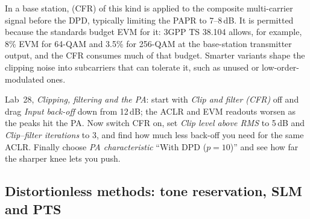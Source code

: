 
In a base station,  (CFR) of this kind is applied to the composite multi-carrier
signal before the DPD, typically limiting the PAPR to 7--8\,dB. It is permitted because the standards budget
EVM for it: 3GPP TS 38.104 allows, for example, 8\% EVM for 64-QAM and 3.5\% for 256-QAM at the base-station
transmitter output, and the CFR consumes much of that budget. Smarter variants shape the clipping noise
into subcarriers that can tolerate it, such as unused or low-order-modulated ones.

\begin{tryit}
Lab~28, \emph{Clipping, filtering and the PA}: start with \emph{Clip and filter (CFR)} off and drag
\emph{Input back-off} down from 12\,dB; the ACLR and EVM readouts worsen as the peaks hit the PA.
Now switch CFR on, set \emph{Clip level above RMS} to 5\,dB and \emph{Clip--filter iterations} to 3,
and find how much less back-off you need for the same ACLR. Finally choose \emph{PA characteristic}
``With DPD ($p=10$)'' and see how far the sharper knee lets you push.
\end{tryit}

\subsection{Distortionless methods: tone reservation, SLM and PTS}

